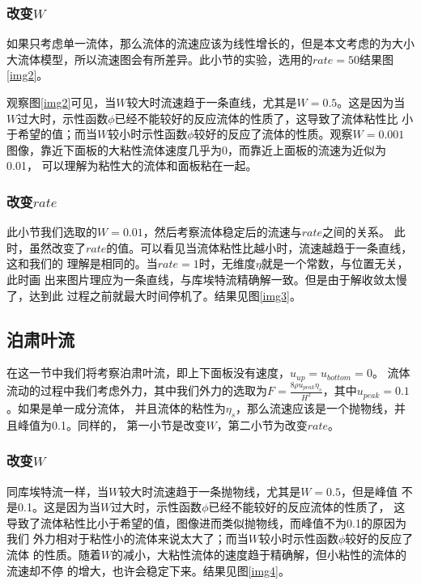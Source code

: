 \documentclass[11pt,UTF8]{ctexart}
\begin{document}
    \subsubsection{改变$W$}
    \par{如果只考虑单一流体，那么流体的流速应该为线性增长的，但是本文考虑的为大小
    大流体模型，所以流速图会有所差异。此小节的实验，选用的$rate=50$结果图\ref {img2}。}
    \par{观察图\ref {img2}可见，当$W$较大时流速趋于一条直线，尤其是$W=0.5$。这是因为当
    $W$过大时，示性函数$\phi$已经不能较好的反应流体的性质了，这导致了流体粘性比
    小于希望的值；而当$W$较小时示性函数$\phi$较好的反应了流体的性质。观察$W=0.001$
    图像，靠近下面板的大粘性流体速度几乎为0，而靠近上面板的流速为近似为0.01，
    可以理解为粘性大的流体和面板粘在一起。}
    \subsubsection{改变$rate$}
    \par{此小节我们选取的$W=0.01$，然后考察流体稳定后的流速与$rate$之间的关系。
    此时，虽然改变了$rate$的值。可以看见当流体粘性比越小时，流速越趋于一条直线，这和我们的
    理解是相同的。当$rate=1$时，无维度$\eta$就是一个常数，与位置无关，此时画
    出来图片理应为一条直线，与库埃特流精确解一致。但是由于解收敛太慢了，达到此
    过程之前就最大时间停机了。结果见图\ref {img3}。}
    \subsection{泊肃叶流}
    \par{在这一节中我们将考察泊肃叶流，即上下面板没有速度，$u_{up}=u_{bottom}=0$。
    流体流动的过程中我们考虑外力，其中我们外力的选取为$F=\frac{8\rho u_{peak} \eta_s}{H^2}$，其中$u_{peak}=0.1$。如果是单一成分流体，
    并且流体的粘性为$\eta_s$，那么流速应该是一个抛物线，并且峰值为0.1。同样的，
    第一小节是改变$W$，第二小节为改变$rate$。}
    \subsubsection{改变$W$}
    \par{同库埃特流一样，当$W$较大时流速趋于一条抛物线，尤其是$W=0.5$，但是峰值
    不是0.1。这是因为当$W$过大时，示性函数$\phi$已经不能较好的反应流体的性质了，
    这导致了流体粘性比小于希望的值，图像进而类似抛物线，而峰值不为0.1的原因为我们
    外力相对于粘性小的流体来说太大了；而当$W$较小时示性函数$\phi$较好的反应了流体
    的性质。随着$W$的减小，大粘性流体的速度趋于精确解，但小粘性的流体的流速却不停
    的增大，也许会稳定下来。结果见图\ref {img4}。}
\end{document}
